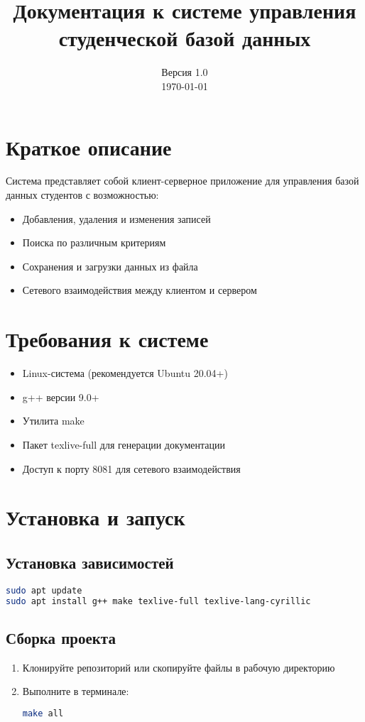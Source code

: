 \documentclass[a4paper,12pt]{article}
\title{Документация к системе управления студенческой базой данных}
\date{Версия 1.0 \\ \today}
\begin{document}
\maketitle

\section*{Краткое описание}
Система представляет собой клиент-серверное приложение для управления базой данных студентов с возможностью:
\begin{itemize}[noitemsep]
\item Добавления, удаления и изменения записей
\item Поиска по различным критериям
\item Сохранения и загрузки данных из файла
\item Сетевого взаимодействия между клиентом и сервером
\end{itemize}

\tableofcontents

\section{Требования к системе}
\begin{itemize}
\item Linux-система (рекомендуется Ubuntu 20.04+)
\item g++ версии 9.0+
\item Утилита make
\item Пакет texlive-full для генерации документации
\item Доступ к порту 8081 для сетевого взаимодействия
\end{itemize}

\section{Установка и запуск}
\subsection{Установка зависимостей}
\begin{lstlisting}[language=bash]
sudo apt update
sudo apt install g++ make texlive-full texlive-lang-cyrillic
\end{lstlisting}

\subsection{Сборка проекта}
\begin{enumerate}
\item Клонируйте репозиторий или скопируйте файлы в рабочую директорию
\item Выполните в терминале:
\begin{lstlisting}[language=bash]
make all
\end{lstlisting}
\end{enumerate}
\end{document}
